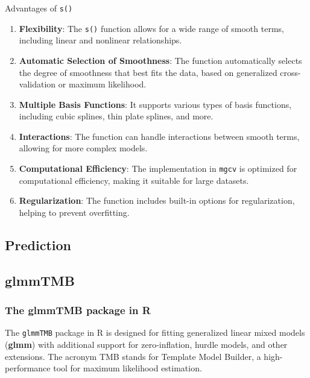 \documentclass[12pt, twoside,hidelinks]{article}
\theoremstyle{definition}
\numberwithin{equation}{section}
\begin{document}
Advantages of \texttt{s()}
\newline
\begin{enumerate}
  \item \textbf{Flexibility}: The \texttt{s()} function allows for a wide range of smooth terms, including linear and nonlinear relationships.
  
  \item \textbf{Automatic Selection of Smoothness}: The function automatically selects the degree of smoothness that best fits the data, based on generalized cross-validation or maximum likelihood.
  
  \item \textbf{Multiple Basis Functions}: It supports various types of basis functions, including cubic splines, thin plate splines, and more.
  
  \item \textbf{Interactions}: The function can handle interactions between smooth terms, allowing for more complex models.
  
  \item \textbf{Computational Efficiency}: The implementation in \texttt{mgcv} is optimized for computational efficiency, making it suitable for large datasets.
  
  \item \textbf{Regularization}: The function includes built-in options for regularization, helping to prevent overfitting.
\end{enumerate}


\subsection{Prediction}


\subsection{glmmTMB}

\subsubsection{The glmmTMB package in R}

The \texttt{glmmTMB} package in R is designed for fitting generalized linear mixed models (\textbf{glmm}) with additional support for zero-inflation, hurdle models, and other extensions. The acronym TMB stands for Template Model Builder, a high-performance tool for maximum likelihood estimation.
\end{document}
